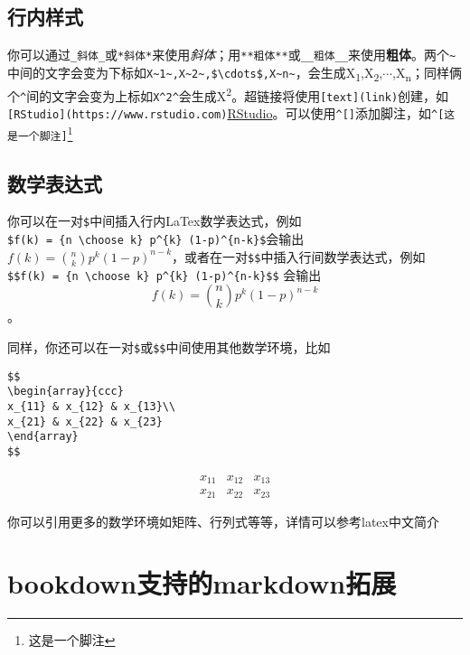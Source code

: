 \documentclass[singlesided]{Style/ucasthesis}%
\begin{document}
\hypertarget{section-1}{%
\subsection{行内样式}\label{section-1}}

你可以通过\texttt{\_斜体\_}或\texttt{*斜体*}来使用\emph{斜体}；用\texttt{**粗体**}或\texttt{\_\_粗体\_\_}来使用\textbf{粗体}。两个\texttt{\textasciitilde{}}中间的文字会变为下标如\texttt{X\textasciitilde{}1\textasciitilde{},X\textasciitilde{}2\textasciitilde{},\$\textbackslash{}cdots\$,X\textasciitilde{}n\textasciitilde{}}，会生成X\textsubscript{1},X\textsubscript{2},\(\cdots\),X\textsubscript{n}；同样俩个\texttt{\^{}}间的文字会变为上标如\texttt{X\^{}2\^{}}会生成X\textsuperscript{2}。超链接将使用\texttt{{[}text{]}(link)}创建，如\texttt{{[}RStudio{]}(https://www.rstudio.com)}\href{https://www.rstudio.com}{RStudio}。可以使用\texttt{\^{}{[}{]}}添加脚注，如\texttt{\^{}{[}这是一个脚注{]}}\footnote{这是一个脚注}

\hypertarget{section-2}{%
\subsection{数学表达式}\label{section-2}}

你可以在一对\texttt{\$}中间插入行内LaTex数学表达式，例如\texttt{\$f(k)\ =\ \{n\ \textbackslash{}choose\ k\}\ p\^{}\{k\}\ (1-p)\^{}\{n-k\}\$}会输出\(f(k) = {n \choose k} p^{k} (1-p)^{n-k}\)，或者在一对\texttt{\$\$}中插入行间数学表达式，例如\texttt{\$\$f(k)\ =\ \{n\ \textbackslash{}choose\ k\}\ p\^{}\{k\}\ (1-p)\^{}\{n-k\}\$\$} 会输出 \[f(k) = {n \choose k} p^{k} (1-p)^{n-k}\]。

同样，你还可以在一对\texttt{\$}或\texttt{\$\$}中间使用其他数学环境，比如

\begin{verbatim}
$$
\begin{array}{ccc}
x_{11} & x_{12} & x_{13}\\
x_{21} & x_{22} & x_{23}
\end{array}
$$
\end{verbatim}

\[
\begin{array}{ccc}
x_{11} & x_{12} & x_{13}\\
x_{21} & x_{22} & x_{23}
\end{array}
\]

你可以引用更多的数学环境如矩阵、行列式等等，详情可以参考latex中文简介

\hypertarget{bookdownmarkdown}{%
\section{bookdown支持的markdown拓展}\label{bookdownmarkdown}}
\end{document}

